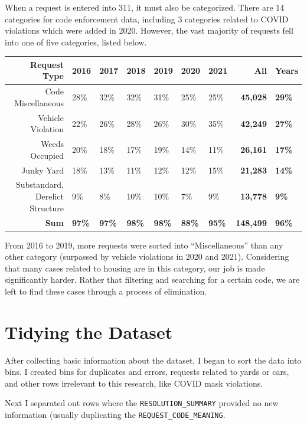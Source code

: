 \documentclass[
  openany]{book}
\begin{document}
When a request is entered into 311, it must also be categorized. There are 14 categories for code enforcement data, including 3 categories related to COVID violations which were added in 2020. However, the vast majority of requests fell into one of five categories, listed below.

\begin{longtable}[]{@{}rllllllrl@{}}
\toprule
Request Type & 2016 & 2017 & 2018 & 2019 & 2020 & 2021 & All & Years \\
\midrule
\endhead
Code Miscellaneous & 28\% & 32\% & 32\% & 31\% & 25\% & 25\% & \textbf{45,028} & \textbf{29\%} \\
Vehicle Violation & 22\% & 26\% & 28\% & 26\% & 30\% & 35\% & \textbf{42,249} & \textbf{27\%} \\
Weeds Occupied & 20\% & 18\% & 17\% & 19\% & 14\% & 11\% & \textbf{26,161} & \textbf{17\%} \\
Junky Yard & 18\% & 13\% & 11\% & 12\% & 12\% & 15\% & \textbf{21,283} & \textbf{14\%} \\
Substandard, Derelict Structure & 9\% & 8\% & 10\% & 10\% & 7\% & 9\% & \textbf{13,778} & \textbf{9\%} \\
\textbf{Sum} & \textbf{97\%} & \textbf{97\%} & \textbf{98\%} & \textbf{98\%} & \textbf{88\%} & \textbf{95\%} & \textbf{148,499} & \textbf{96\%} \\
\bottomrule
\end{longtable}

From 2016 to 2019, more requests were sorted into ``Miscellaneous'' than any other category (surpassed by vehicle violations in 2020 and 2021). Considering that many cases related to housing are in this category, our job is made significantly harder. Rather that filtering and searching for a certain code, we are left to find these cases through a process of elimination.

\hypertarget{tidying-the-dataset}{%
\section{Tidying the Dataset}\label{tidying-the-dataset}}

After collecting basic information about the dataset, I began to sort the data into bins. I created bins for duplicates and errors, requests related to yards or cars, and other rows irrelevant to this research, like COVID mask violations.

Next I separated out rows where the \texttt{RESOLUTION\_SUMMARY} provided no new information (usually duplicating the \texttt{REQUEST\_CODE\_MEANING}.
\end{document}
